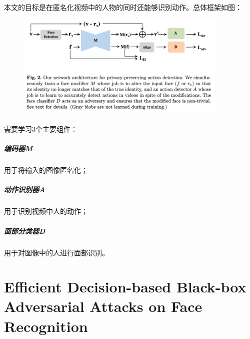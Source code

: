 \documentclass[12pt,a4paper]{article}
\begin{document}
\paragraph{} 本文的目标是在匿名化视频中的人物的同时还能够识别动作。总体框架如图：
\begin{figure}[H]
	\centering
	\includegraphics[width=0.9\textwidth]{../images/face-anonymity-framework.png}
	\caption{}
	\label{laplace-distribution}
\end{figure}
\paragraph{} 需要学习3个主要组件：
	\subparagraph{编码器M} 用于将输入的图像匿名化；
	\subparagraph{动作识别器A} 用于识别视频中人的动作；
	 \subparagraph{面部分类器D} 用于对图像中的人进行面部识别。


\newpage
\section{Efficient Decision-based Black-box Adversarial Attacks on Face Recognition\cite{blace-box-attack-fr}}



\newpage


\end{document}
